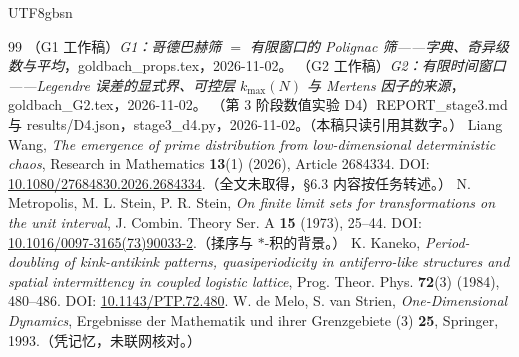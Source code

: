 \documentclass[11pt,a4paper]{article}
\theoremstyle{plain}
\theoremstyle{definition}
\begin{document}
\begin{CJK}{UTF8}{gbsn}
\begin{thebibliography}{99}
 （G1 工作稿）\emph{G1：哥德巴赫筛 $=$ 有限窗口的 Polignac 筛——字典、奇异级数与平均}，goldbach\_props.tex，2026-11-02。
 （G2 工作稿）\emph{G2：有限时间窗口——Legendre 误差的显式界、可控层 $k_{\max}(N)$ 与 Mertens 因子的来源}，goldbach\_G2.tex，2026-11-02。
 （第 3 阶段数值实验 D4）REPORT\_stage3.md 与 results/D4.json，stage3\_d4.py，2026-11-02。（本稿只读引用其数字。）
 Liang Wang, \emph{The emergence of prime distribution from low-dimensional deterministic chaos},
Research in Mathematics \textbf{13}(1) (2026), Article 2684334. DOI: \url{10.1080/27684830.2026.2684334}.（全文未取得，\S6.3 内容按任务转述。）
 N. Metropolis, M. L. Stein, P. R. Stein, \emph{On finite limit sets for transformations on the unit interval},
J. Combin. Theory Ser. A \textbf{15} (1973), 25--44. DOI: \url{10.1016/0097-3165(73)90033-2}.（揉序与 $*$-积的背景。）
 K. Kaneko, \emph{Period-doubling of kink-antikink patterns, quasiperiodicity in antiferro-like structures and spatial intermittency in coupled logistic lattice},
Prog. Theor. Phys. \textbf{72}(3) (1984), 480--486. DOI: \url{10.1143/PTP.72.480}.
 W. de Melo, S. van Strien, \emph{One-Dimensional Dynamics}, Ergebnisse der Mathematik und ihrer Grenzgebiete (3) \textbf{25}, Springer, 1993.（凭记忆，未联网核对。）
\end{thebibliography}

\end{CJK}
\end{document}
